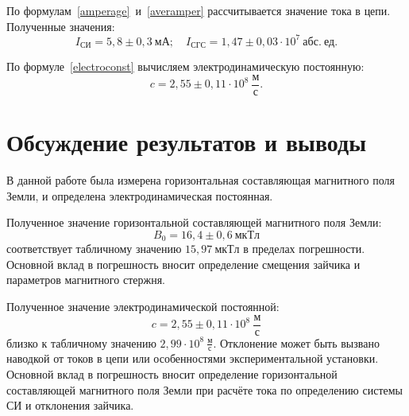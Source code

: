 \documentclass[a4paper, 12pt]{article}
\begin{document}
По формулам~\eqref{amperage}~и~\eqref{averamper} рассчитывается значение тока в цепи. Полученные значения:
$$I_{СИ} = 5,8\pm0,3~мА; \quad I_{СГС} = 1,47\pm0,03\cdot10^7~абс.~ед.$$

По формуле~\eqref{electroconst} вычисляем электродинамическую постоянную:
$$c = 2,55\pm0,11\cdot10^8~\frac{м}{с}.$$

\section{Обсуждение результатов и выводы}

В данной работе была измерена горизонтальная составляющая магнитного поля Земли, и определена электродинамическая постоянная.

Полученное значение горизонтальной составляющей магнитного поля Земли:
$$\boxed{B_0 = 16,4\pm0,6~мкТл}$$
соответствует табличному значению $15,97~мкТл$ в пределах погрешности. Основной вклад в погрешность вносит определение смещения зайчика и параметров магнитного стержня.

Полученное значение электродинамической постоянной:
$$\boxed{c = 2,55\pm0,11\cdot10^8~\frac{м}{с}}$$
близко к табличному значению $2,99\cdot10^8~\frac{м}{с}$. Отклонение может быть вызвано наводкой от токов в цепи или особенностями экспериментальной установки. Основной вклад в погрешность вносит определение горизонтальной составляющей магнитного поля Земли при расчёте тока по определению системы СИ и отклонения зайчика.
\end{document}
